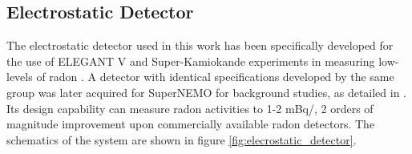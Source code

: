 \newpage
\subsection{Electrostatic Detector}
\label{secsec:electrostatic_detector}

The electrostatic detector used in this work has been specifically developed for the use of ELEGANT V and Super-Kamiokande experiments in measuring low-levels of radon \cite{CHOI2001177, MITSUDA2003414}. A detector with identical specifications developed by the same group was later acquired for SuperNEMO for background studies, as detailed in \cite{mott_2013}. Its design capability can measure radon activities to 1-2 mBq/\cubicmeter{}, 2 orders of magnitude improvement upon commercially available radon detectors. The schematics of the system are shown in figure \ref{fig:elecrostatic_detector}. 
%
